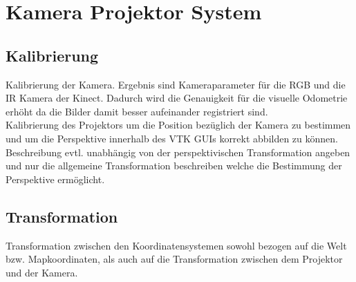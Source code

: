 \chapter{Kamera Projektor System}

\section{Kalibrierung}
Kalibrierung der Kamera. Ergebnis sind Kameraparameter für die RGB und die IR Kamera der Kinect. Dadurch wird die Genauigkeit für die visuelle Odometrie erhöht da die Bilder damit besser aufeinander registriert sind.\\
Kalibrierung des Projektors um die Position bezüglich der Kamera zu bestimmen und um die Perspektive innerhalb des VTK GUIs korrekt abbilden zu können. Beschreibung evtl. unabhängig von der perspektivischen Transformation angeben und nur die allgemeine Transformation beschreiben welche die Bestimmung der Perspektive ermöglicht.

\section{Transformation}
Transformation zwischen den Koordinatensystemen sowohl bezogen auf die Welt bzw. Mapkoordinaten, als auch auf die Transformation zwischen dem Projektor und der Kamera.